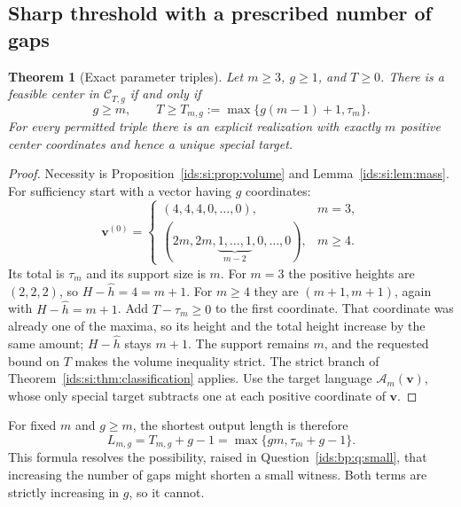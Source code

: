 \documentclass[11pt,letterpaper]{article}
\newtheorem{theorem}{Theorem}[section]
\theoremstyle{definition}\newtheorem{definition}[theorem]{Definition}
\theoremstyle{remark}\newtheorem{remark}[theorem]{Remark}
\theoremstyle{definition}\newtheorem{question}[theorem]{Question}
\newcommand{\bpC}[2]{\mathcal C_{#1,#2}}
\newcommand{\Adm}[1]{\mathcal A_m(#1)}
\begin{document}
\subsection{Sharp threshold with a prescribed number of gaps}
\begin{theorem}[Exact parameter triples]\label{ids:si:thm:triples}
Let $m\geq3$, $g\geq1$, and $T\geq0$. There is a feasible center in
$\bpC{T}{g}$ if and only if
\begin{equation}\label{ids:si:eq:triples}
 g\geq m,\qquad T\geq T_{m,g}:=\max\{g(m-1)+1,\tau_m\}.
\end{equation}
For every permitted triple there is an explicit realization with exactly
$m$ positive center coordinates and hence a unique special target.
\end{theorem}
\begin{proof}
Necessity is Proposition~\ref{ids:si:prop:volume} and Lemma~\ref{ids:si:lem:mass}. For sufficiency start with a vector
having $g$ coordinates:
\begin{equation}\label{ids:si:eq:basecenters}
 \mathbf v^{(0)}=\begin{cases}
 (4,4,4,0,\ldots,0),&m=3,\\
 (2m,2m,\underbrace{1,\ldots,1}_{m-2},0,\ldots,0),&m\geq4.
 \end{cases}
\end{equation}
Its total is $\tau_m$ and its support size is $m$. For $m=3$ the positive
heights are $(2,2,2)$, so $H-\hat h=4=m+1$. For $m\geq4$ they are
$(m+1,m+1)$, again with $H-\hat h=m+1$.
Add $T-\tau_m\geq0$ to the first coordinate. That coordinate was already
one of the maxima, so its height and the total height increase by the
same amount; $H-\hat h$ stays $m+1$. The support remains $m$, and the requested
bound on $T$ makes the volume inequality strict. The strict branch of
Theorem~\ref{ids:si:thm:classification} applies. Use the target language
$\Adm{\mathbf v}$, whose only special target subtracts one at each positive
coordinate of $\mathbf v$.
\end{proof}

For fixed $m$ and $g\geq m$, the shortest output length is therefore
\begin{equation}\label{ids:si:eq:fixedgaplength}
 L_{m,g}=T_{m,g}+g-1=\max\{gm,\tau_m+g-1\}.
\end{equation}
This formula resolves the possibility, raised in
Question~\ref{ids:bp:q:small},
that increasing the number of gaps might shorten a small witness. Both
terms are strictly increasing in $g$, so it cannot.
\end{document}
